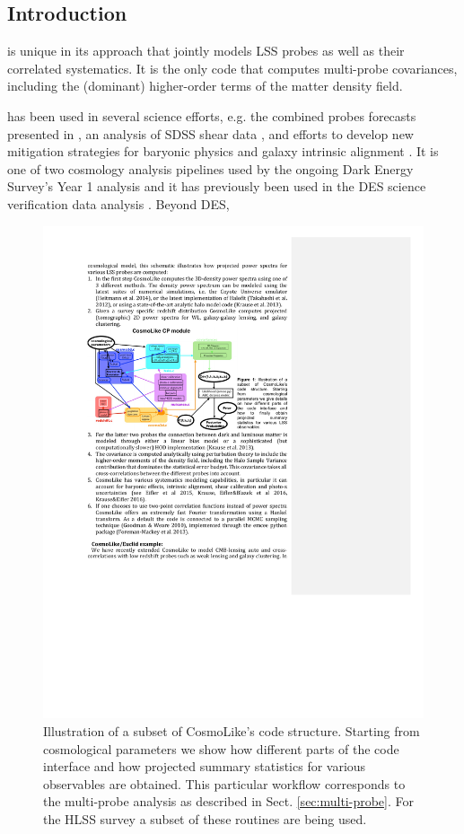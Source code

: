 \subsection{\CoLi Introduction}
\label{sec:cosmolike}

\begin{summaryii}
  \CoLi is unique in its approach that jointly models LSS probes as well as their correlated systematics. It is the only code that computes multi-probe covariances, including the (dominant) higher-order terms of the matter density field.
\end{summaryii}

\CoLi has been used in several science efforts, e.g. the combined probes forecasts presented in \citep{Eifler:2014}, an analysis of SDSS shear data \citep{Huff2014}, and efforts to develop new mitigation strategies for baryonic physics \citep{Eifler2015} and galaxy intrinsic alignment \citep{Krause2016}. It is one of two cosmology analysis pipelines used by the ongoing Dark Energy Survey's Year 1 analysis and it has previously been used in the DES science verification data analysis \citep{DES2015}. Beyond DES,
\begin{figure}
  \includegraphics[width=16.0cm]{Plots/forecasts/cosmolike_codestruct}
   \caption{Illustration of a subset of CosmoLike's code structure. Starting from cosmological parameters we show how different parts of the code interface and how projected summary statistics for various observables are obtained. This particular workflow corresponds to the multi-probe analysis as described in Sect. {\ref{sec:multi-probe}}. For the HLSS survey a subset of these routines are being used.
}
  \label{fi:fcosmolike}
\end{figure}
